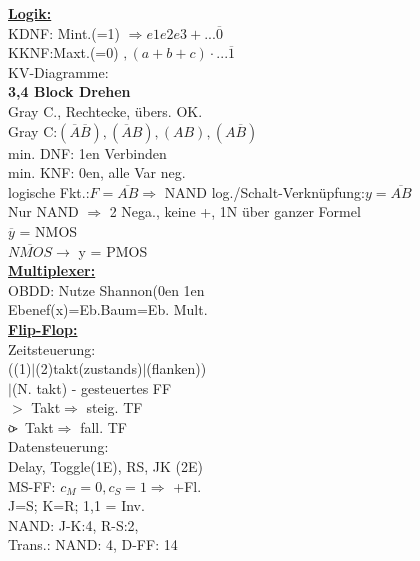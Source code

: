 \documentclass[8pt]{extarticle}
\begin{document}
\begin{minipage}{0.33\textwidth}


\underline{\textbf{Logik:}}\\
KDNF: Mint.(=1) $\Rightarrow e1e2e3 + ...\overline{0}$\\
KKNF:Maxt.(=0) $, (a+b+c) \cdot ...\overline{1}$\\
KV-Diagramme:\\ 
\textbf{3,4 Block Drehen}\\
Gray C., Rechtecke, übers. OK.\\
Gray C:$(\overline{A} \overline{B}), (\overline{A}B), (AB), (A\overline{B})$\\
min. DNF: 1en Verbinden\\
min. KNF: 0en, alle Var neg.\\
logische Fkt.:$F = \overline{AB} \Rightarrow $ NAND
log./Schalt-Verknüpfung:$y = \overline{AB} $\\
Nur NAND $\Rightarrow$ 2 Nega., keine +, 1N über ganzer Formel\\
$\overline{y}$ = NMOS\\
$\overline{NMOS} \rightarrow$ y = PMOS\\


\underline{\textbf{Multiplexer:}}\\
OBDD: Nutze Shannon(0en 1en\\
Ebenef(x)=Eb.Baum=Eb. Mult.\\

\vspace{3cm}
\underline{\textbf{Flip-Flop:}}\\
Zeitsteuerung:\\ ((1)$|$(2)takt(zustands)$|$(flanken))\\$|$(N. takt) - gesteuertes FF\\
$>$ Takt$\Rightarrow$ steig. TF\\
$\rlap{o}{>}$ Takt$\Rightarrow$ fall. TF\\
Datensteuerung:\\ Delay, Toggle(1E), RS, JK (2E)\\
MS-FF: $c_M=0,c_S=1 \Rightarrow$ +Fl.\\
J=S; K=R; 1,1 = Inv.\\
NAND: J-K:4, R-S:2,\\
Trans.: NAND: 4, D-FF: 14\\



\end{minipage}
~~~~~~~
\end{document}
